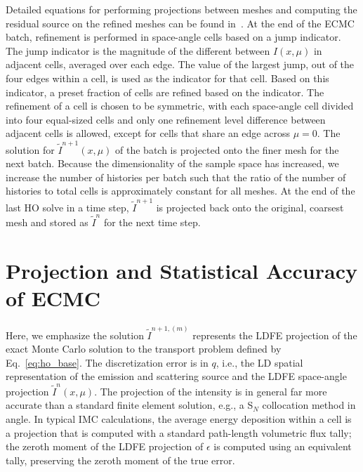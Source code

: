 Detailed equations for performing projections between meshes and computing the residual source on
the refined meshes can be found in~\cite{jake}.  At the end of the ECMC batch,
refinement is performed in space-angle cells based on a jump indicator.  The jump
indicator is the magnitude of the different between $I(x,\mu)$ in adjacent cells,
averaged over each edge.  The value of the largest jump, out of the four edges within a
cell, is used as the
indicator for that cell.  Based on this indicator, a preset fraction of cells are refined based on the indicator.
The refinement of a cell is chosen to be symmetric, with each space-angle cell divided into four
equal-sized cells and only one refinement level difference between adjacent cells is
allowed, except for cells that share an edge across $\mu=0$.  The solution for $\tilde{I}^{n+1}(x,\mu)$ of the batch is projected onto
the finer mesh for the next batch. Because the dimensionality of the sample space has
increased, we increase the number of histories per batch such that the ratio of the number
of histories to total cells is approximately constant for all meshes.  At the end of the last HO solve in a time step,
$\tilde{I}^{n+1}$ is projected back onto the original, coarsest mesh and stored as
$\tilde{I}^{n}$ for the next time step.

\section{Projection and Statistical Accuracy of ECMC}

Here, we emphasize the solution $\tilde{I}^{n+1,(m)}$ represents the LDFE projection of the exact Monte Carlo
solution to the transport problem defined by Eq.~\eqref{eq:ho_base}.  The discretization error is in $q$, i.e., the LD spatial
representation of the emission and scattering source and the LDFE space-angle projection $\tilde I^{n}(x,\mu)$.
 The projection of the intensity is in
general far more accurate than a standard finite element solution, e.g., a S$_N$ collocation method in angle.  In typical IMC calculations, the average
energy deposition within a cell is a projection that is computed with a standard path-length volumetric
flux tally; the zeroth moment of the LDFE projection of ${\epsilon}$ is
computed using an equivalent tally, preserving the zeroth moment of the true error.

